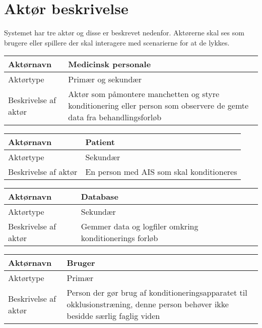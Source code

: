 	\section{Aktør beskrivelse}
	Systemet har tre aktør og disse er beskrevet nedenfor. Aktørerne skal ses som brugere eller spillere der skal interagere med scenarierne for at de lykkes. 
	
	\begin{center}
		\begin{tabular}{ | m{4cm} | m{8cm}| } 
			\hline
			Aktørnavn& Medicinsk personale  \\ 
			\hline
			Aktørtype & Primær og sekundær \\ 
			\hline
			Beskrivelse af aktør & Aktør som påmontere manchetten og styre konditionering eller person som observere de gemte data fra behandlingsforløb\\ 
			\hline
		\end{tabular}
	\end{center}
	
	\begin{center}
		\begin{tabular}{ | m{4cm} | m{8cm}| } 
			\hline
			Aktørnavn& Patient \\ 
			\hline
			Aktørtype & Sekundær \\ 
			\hline
			Beskrivelse af aktør & En person med AIS som skal konditioneres\\ 
			\hline
		\end{tabular}
	\end{center}
	
	\begin{center}
		\begin{tabular}{ | m{4cm} | m{8cm}| } 
			\hline
			Aktørnavn& Database \\ 
			\hline
			Aktørtype & Sekundær \\ 
			\hline
			Beskrivelse af aktør & Gemmer data og logfiler omkring konditionerings forløb\\ 
			\hline
		\end{tabular}
	\end{center}
	
	\begin{center}
		\begin{tabular}{ | m{4cm} | m{8cm}| } 
			\hline
			Aktørnavn& Bruger \\ 
			\hline
			Aktørtype & Primær \\ 
			\hline
			Beskrivelse af aktør & Person der gør brug af konditioneringsapparatet til okklusionstræning, denne person behøver ikke besidde særlig faglig viden \\ 
			\hline
		\end{tabular}
	\end{center}